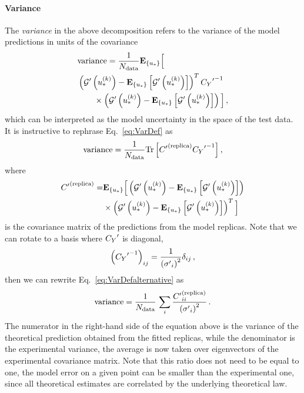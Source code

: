 \paragraph{Variance}

The {\em variance} in the above decomposition refers to the variance of the
model predictions in units of the covariance
\begin{equation}
    \label{eq:VarDef}
    \begin{split}
        &{\rm variance} = \frac{1}{N_{\rm data}}\mathbf{E}_{\{ u_* \}} \Big[ \\
            &\left( {{\mathcal{G}}^{\prime}}\left(u_*^{(k)}\right) - 
            \mathbf{E}_{\{ u_* \}} \left[ {{\mathcal{G}}^{\prime}}\left(u_*^{(k)}\right) \right] \right)^T
            {{C_{Y}}^{\prime}}^{-1}\\
            &\quad\quad\times\left( {{\mathcal{G}}^{\prime}}\left(u_*^{(k)}\right) - 
            \mathbf{E}_{\{ u_* \}} \left[ {{\mathcal{G}}^{\prime}}\left(u_*^{(k)}\right) \right] \right)
        \Big] \, ,
    \end{split}
\end{equation}
which can be interpreted as the model uncertainty in the space of the test data.
It is instructive to rephrase Eq.~\ref{eq:VarDef} as
\begin{equation}
    \label{eq:VarDefalternative}
    {\rm variance} = \frac{1}{N_{\rm data}} {\rm Tr} \left[ {{C}^{\prime}}^{(\rm replica)} {{C_{Y}}^{\prime}}^{-1} \right],
\end{equation}
where 
\begin{align}
    \label{eq:CovRep}
    {{C}^{\prime}}^{(\rm replica)} = 
    &\mathbf{E}_{\{ u_* \}} \Big[
            \left( {{\mathcal{G}}^{\prime}}\left(u_*^{(k)}\right) - 
            \mathbf{E}_{\{ u_* \}} \left[ {{\mathcal{G}}^{\prime}}\left(u_*^{(k)}\right) \right] \right)\nonumber \\
            &\times\left( {{\mathcal{G}}^{\prime}}\left(u_*^{(k)}\right) - 
            \mathbf{E}_{\{ u_* \}} \left[ {{\mathcal{G}}^{\prime}}\left(u_*^{(k)}\right) \right] \right)^T
            \Big]
\end{align}
is the covariance matrix of the predictions from the model replicas. Note that
we can rotate to a basis where ${{C_{Y}}^{\prime}}$ is diagonal,
\begin{equation}
    \label{eq:InvCovPrimeDiag}
    \left({{C_{Y}}^{\prime}}^{-1} \right)_{ij} = \frac{1}{\left({{\sigma}^{\prime}}_i\right)^2} 
    \delta_{ij}\, ,
\end{equation}
then we can rewrite Eq.~\ref{eq:VarDefalternative} as 
\begin{equation}
    \label{eq:VarianceInterpretation}
    {\rm variance} = \frac{1}{N_{\rm data}}\, \sum_i \frac{{{C}^{\prime}}^{(\rm replica)}_{ii}}{\left({{\sigma}^{\prime}}_i\right)^2}\, .
\end{equation}
The numerator in the right-hand side of the equation above is the variance of
the theoretical prediction obtained from the fitted replicas, while the
denominator is the experimental variance, the average is now taken over
eigenvectors of the experimental covariance matrix. Note that this ratio does
not need to be equal to one, the model error on a given point can be smaller
than the experimental one, since all theoretical estimates are correlated by the
underlying theoretical law. 

